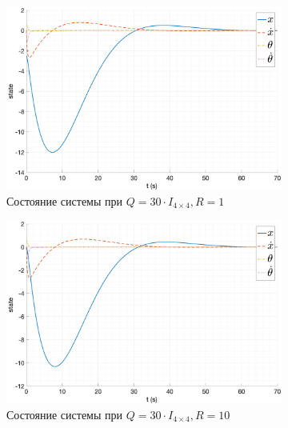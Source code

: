 \begin{figure}[ht!]
    \centering
    \begin{subfigure}[b]{0.45\textwidth}
        \centering
        \includegraphics[width=\textwidth]{media/plots/LQR/state_6.png}
        \caption{Состояние системы при $Q = 30 \cdot I_{4\times 4}, R = 1$}
    \end{subfigure}
    \begin{subfigure}[b]{0.45\textwidth}
        \centering
        \includegraphics[width=\textwidth]{media/plots/LQR/state_7.png}
        \caption{Состояние системы при $Q = 30 \cdot I_{4\times 4}, R = 10$}
    \end{subfigure}
    \begin{subfigure}[b]{0.45\textwidth}
        \centering

\end{subfigure}
\end{figure}
